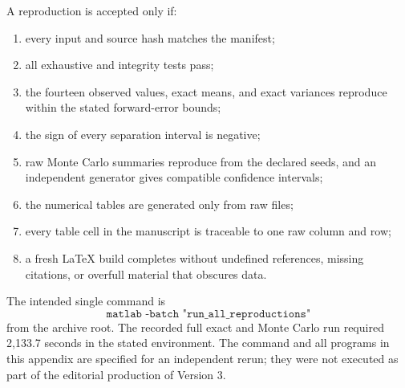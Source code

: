 \documentclass[11pt,reqno]{amsart}
\numberwithin{equation}{section}
\theoremstyle{plain}
\theoremstyle{definition}
\theoremstyle{remark}
\begin{document}
A reproduction is accepted only if:
\begin{enumerate}[label=(\roman*)]
\item every input and source hash matches the manifest;
\item all exhaustive and integrity tests pass;
\item the fourteen observed values, exact means, and exact variances reproduce
within the stated forward-error bounds;
\item the sign of every separation interval is negative;
\item raw Monte Carlo summaries reproduce from the declared seeds, and an
independent generator gives compatible confidence intervals;
\item the numerical tables are generated only from raw files;
\item every table cell in the manuscript is traceable to one raw column and
row;
\item a fresh LaTeX build completes without undefined references, missing
citations, or overfull material that obscures data.
\end{enumerate}

The intended single command is
\begin{equation}
\texttt{matlab -batch "run\_all\_reproductions"}
\label{eq:single-reproduction-command}
\end{equation}
from the archive root.  The recorded full exact and Monte Carlo run required
2,133.7 seconds in the stated environment.  The command and all programs in
this appendix are specified for an independent rerun; they were not executed
as part of the editorial production of Version 3.
\end{document}
